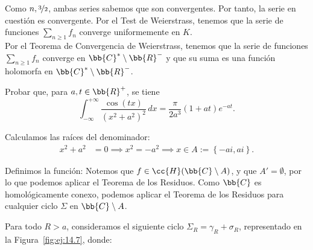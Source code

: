 \documentclass[12pt]{article}
\begin{document}
\begin{ejercicio}[2.5 puntos]
\begin{enumerate}
            Como $n,\nicefrac{3}{2}$, ambas series sabemos que son convergentes. Por tanto, la serie en cuestión es convergente. Por el Test de Weierstrass, tenemos que la serie de funciones $\sum\limits_{n\geq 1} f_n$ converge uniformemente en $K$.\\

            Por el Teorema de Convergencia de Weierstrass, tenemos que la serie de funciones $\sum\limits_{n\geq 1} f_n$ converge en $\bb{C}^* \setminus \bb{R}^-$ y que su suma es una función holomorfa en $\bb{C}^* \setminus \bb{R}^-$.
        \end{enumerate}
    \end{ejercicio}

    \begin{ejercicio}[2.5 puntos]\label{ej:2}
        Probar que, para $a, t \in \bb{R}^+$, se tiene
        \[
            \int_{-\infty}^{+\infty} \frac{\cos(tx)}{(x^2 + a^2)^2} \, dx = \frac{\pi}{2a^3} (1 + at) e^{-at}.
        \]

        Calculamos las raíces del denominador:
        \begin{align*}
            x^2 + a^2 &= 0 \implies x^2 = -a^2 \implies x\in A:=\left\{-ai, ai\right\}.
        \end{align*}

        Definimos la función:
        Notemos que $f\in \cc{H}(\bb{C}\setminus A)$, y que $A'=\emptyset$, por lo que podemos aplicar el Teorema de los Residuos. Como $\bb{C}$ es homológicamente conexo, podemos aplicar el Teorema de los Residuos para cualquier ciclo $\Sigma$ en $\bb{C}\setminus A$.

        Para todo $R > a$, consideramos el siguiente ciclo $\Sigma_R = \gamma_R + \sigma_R$, representado en la Figura~\ref{fig:ej:14.7}, donde:
        \begin{figure}
            \centering
\end{figure}
\end{ejercicio}
\end{document}
